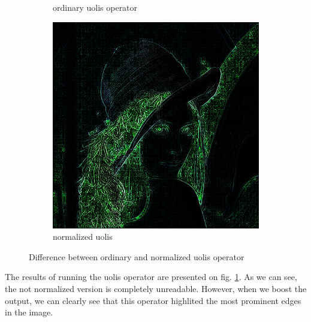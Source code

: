 \documentclass[12pt]{article}
\begin{document}
\begin{figure}[H]
\begin{subfigure}[t]{\subfiguresize}
        \caption{ordinary uolis operator}
    \end{subfigure}
    \hfill
    \begin{subfigure}[t]{\subfiguresize}
        \includegraphics[width=\textwidth]{lena_uolis_normalized.png}
        \caption{normalized uolis}
    \end{subfigure}
    \hfill
    \caption{Difference between ordinary and normalized uolis operator}
    \label{fig:uolis}
\end{figure}

The results of running the uolis operator are presented on fig. \ref{fig:uolis}.
As we can see, the not normalized version is completely unreadable.
However, when we boost the output,
we can clearly see that this operator highlited the most prominent edges in the image.
\end{document}
